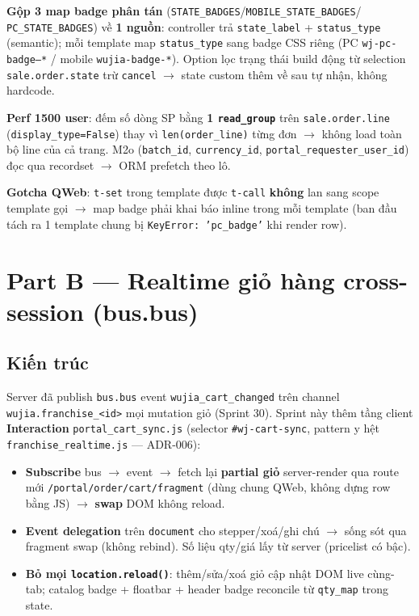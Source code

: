 \textbf{Gộp 3 map badge phân tán} (\texttt{STATE\_BADGES}/\texttt{MOBILE\_STATE\_BADGES}/
\texttt{PC\_STATE\_BADGES}) về \textbf{1 nguồn}: controller trả \texttt{state\_label} +
\texttt{status\_type} (semantic); mỗi template map \texttt{status\_type} sang badge CSS riêng
(PC \texttt{wj-pc-badge--*} / mobile \texttt{wujia-badge-*}). Option lọc trạng thái build động từ
selection \texttt{sale.order.state} trừ \texttt{cancel} $\rightarrow$ state custom thêm về sau tự
nhận, không hardcode.

\textbf{Perf 1500 user}: đếm số dòng SP bằng \textbf{1 \texttt{read\_group}} trên
\texttt{sale.order.line} (\texttt{display\_type=False}) thay vì \texttt{len(order\_line)} từng đơn
$\rightarrow$ không load toàn bộ line của cả trang. M2o (\texttt{batch\_id}, \texttt{currency\_id},
\texttt{portal\_requester\_user\_id}) đọc qua recordset $\rightarrow$ ORM prefetch theo lô.

\textbf{Gotcha QWeb}: \texttt{t-set} trong template được \texttt{t-call} \textbf{không} lan sang
scope template gọi $\rightarrow$ map badge phải khai báo inline trong mỗi template (ban đầu tách ra
1 template chung bị \texttt{KeyError: 'pc\_badge'} khi render row).

\section{Part B --- Realtime giỏ hàng cross-session (bus.bus)}

\subsection{Kiến trúc}

Server đã publish \texttt{bus.bus} event \texttt{wujia\_cart\_changed} trên channel
\texttt{wujia.franchise\_<id>} mọi mutation giỏ (Sprint 30). Sprint này thêm tầng client
\textbf{Interaction} \texttt{portal\_cart\_sync.js} (selector \texttt{\#wj-cart-sync}, pattern y hệt
\texttt{franchise\_realtime.js} --- ADR-006):

\begin{itemize}
\item \textbf{Subscribe} bus $\rightarrow$ event $\rightarrow$ fetch lại \textbf{partial giỏ}
      server-render qua route mới \texttt{/portal/order/cart/fragment} (dùng chung QWeb, không dựng
      row bằng JS) $\rightarrow$ \textbf{swap} DOM không reload.
\item \textbf{Event delegation} trên \texttt{document} cho stepper/xoá/ghi chú $\rightarrow$ sống sót
      qua fragment swap (không rebind). Số liệu qty/giá lấy từ server (pricelist có bậc).
\item \textbf{Bỏ mọi \texttt{location.reload()}}: thêm/sửa/xoá giỏ cập nhật DOM live cùng-tab;
      catalog badge + floatbar + header badge reconcile từ \texttt{qty\_map} trong state.
\end{itemize}

